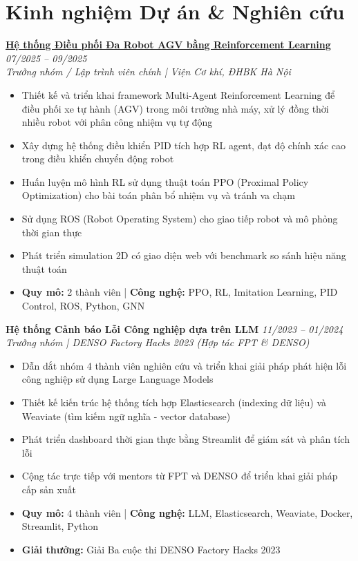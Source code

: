 \documentclass[11pt,a4paper]{article}
\newcommand{\cventry}[4]{
  \noindent\textbf{#1} \hfill \textit{#2} \\
  \textit{#3} \\
  #4
  \vspace{0.4em}
}
\begin{document}
\section{Kinh nghiệm Dự án \& Nghiên cứu}

\cventry
  {\href{https://andrewhaward2310.github.io/gnn-il-ppo-paper/}{Hệ thống Điều phối Đa Robot AGV bằng Reinforcement Learning}}
  {07/2025 -- 09/2025}
  {Trưởng nhóm / Lập trình viên chính | Viện Cơ khí, ĐHBK Hà Nội}
  {
    \begin{itemize}[leftmargin=1.5em, topsep=0pt, itemsep=0.15em]
      \item Thiết kế và triển khai framework Multi-Agent Reinforcement Learning để điều phối xe tự hành (AGV) trong môi trường nhà máy, xử lý đồng thời nhiều robot với phân công nhiệm vụ tự động
      \item Xây dựng hệ thống điều khiển PID tích hợp RL agent, đạt độ chính xác cao trong điều khiển chuyển động robot
      \item Huấn luyện mô hình RL sử dụng thuật toán PPO (Proximal Policy Optimization) cho bài toán phân bổ nhiệm vụ và tránh va chạm
      \item Sử dụng ROS (Robot Operating System) cho giao tiếp robot và mô phỏng thời gian thực
      \item Phát triển simulation 2D có giao diện web với benchmark so sánh hiệu năng thuật toán
      \item \textbf{Quy mô:} 2 thành viên \quad | \quad \textbf{Công nghệ:} PPO, RL, Imitation Learning, PID Control, ROS, Python, GNN
    \end{itemize}
  }

\cventry
  {Hệ thống Cảnh báo Lỗi Công nghiệp dựa trên LLM}
  {11/2023 -- 01/2024}
  {Trưởng nhóm | DENSO Factory Hacks 2023 (Hợp tác FPT \& DENSO)}
  {
    \begin{itemize}[leftmargin=1.5em, topsep=0pt, itemsep=0.15em]
      \item Dẫn dắt nhóm 4 thành viên nghiên cứu và triển khai giải pháp phát hiện lỗi công nghiệp sử dụng Large Language Models
      \item Thiết kế kiến trúc hệ thống tích hợp Elasticsearch (indexing dữ liệu) và Weaviate (tìm kiếm ngữ nghĩa - vector database)
      \item Phát triển dashboard thời gian thực bằng Streamlit để giám sát và phân tích lỗi
      \item Cộng tác trực tiếp với mentors từ FPT và DENSO để triển khai giải pháp cấp sản xuất
      \item \textbf{Quy mô:} 4 thành viên \quad | \quad \textbf{Công nghệ:} LLM, Elasticsearch, Weaviate, Docker, Streamlit, Python
      \item \textbf{Giải thưởng:} Giải Ba cuộc thi DENSO Factory Hacks 2023
    \end{itemize}
  }
\end{document}
